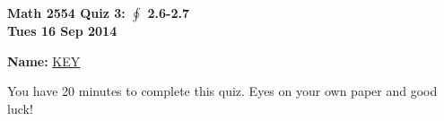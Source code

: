 \documentclass[11pt,letterpaper]{article}
\begin{document}
\flushleft
\begin{multicols}{2}

\begin{large}\textbf{Math 2554 Quiz 3: $\oint $ 2.6-2.7 \\
Tues 16 Sep 2014}\end{large}

\hfill\textbf{Name:  }\underline{\hspace{17ex} KEY\hspace{17ex}}

\vspace{.5in}

\end{multicols}

\pagestyle{empty}

\flushleft

You have 20 minutes to complete this quiz.  Eyes on your own paper and good luck!
\end{document}
